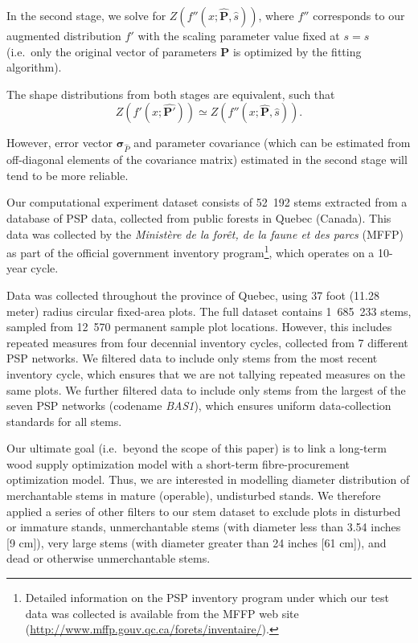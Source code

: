 \documentclass{article}
\begin{document}
In the second stage, we solve for  $Z(f''(x; \bm{\hat{P}}, \hat{s}))$, where $f''$ corresponds to our augmented distribution $f'$ with the scaling parameter value fixed at $s = \hat{s}$ (i.e.~only the original vector of parameters $\bm{P}$ is optimized by the fitting algorithm).

The shape distributions from both stages are equivalent, such that
\begin{equation}
 Z(f'(x; \bm{\hat{P'}})) \simeq Z(f''(x; \bm{\hat{P}}, \hat{s})). 
\end{equation}

However, error vector $\bm{\sigma}_{\hat{P}}$ and parameter covariance (which can be estimated from off-diagonal elements of the covariance matrix) estimated in the second stage will tend to be more reliable.


Our computational experiment dataset consists of 52~192 stems extracted from a database of PSP data, collected from public forests in Quebec (Canada). 
This data was collected by the \emph{Ministère de la forêt, de la faune et des parcs} (MFFP) as part of the official government inventory program\footnote{Detailed information on the
  PSP inventory program under which our test data was collected is available from the MFFP web site (\url{http://www.mffp.gouv.qc.ca/forets/inventaire/}).}, which operates on a 10-year cycle.

Data was collected throughout the province of Quebec, using 37 foot (11.28 meter) radius circular fixed-area plots.
The full dataset contains 1~685~233 stems, sampled from 12~570 permanent sample plot locations.
However, this includes repeated measures from four decennial inventory cycles, collected from 7 different PSP networks.
We filtered data to include only stems from the most recent inventory cycle, which ensures that we are not tallying repeated measures on the same plots.
We further filtered data to include only stems from the largest of the seven PSP networks (codename \emph{BAS1}), which ensures uniform data-collection standards for all stems.

Our ultimate goal (i.e.~beyond the scope of this paper) is to link a long-term wood supply optimization model with a short-term fibre-procurement optimization model.  
Thus, we are interested in modelling diameter distribution of merchantable stems in mature (operable), undisturbed stands.
We therefore applied a series of other filters to our stem dataset to exclude plots in disturbed or immature stands, unmerchantable stems (with diameter less than 3.54 inches [9 cm]), very large stems (with diameter greater than 24 inches [61 cm]), and dead or otherwise unmerchantable stems.
\end{document}
